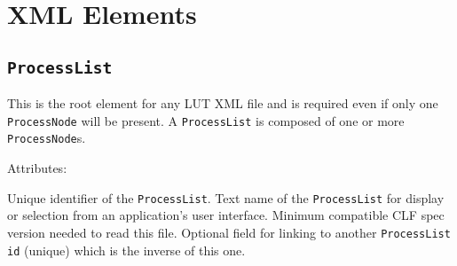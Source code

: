 \regularsectionformat
\chapter{XML Elements}
\label{sec:XMLelements}

\section{\texttt{ProcessList}}
This is the root element for any LUT XML file and is required even if only one \texttt{ProcessNode} will be present. A \texttt{ProcessList} is composed of one or more \texttt{ProcessNode}s.

Attributes:
\begin{xmlfields}
	\xmlitem[id][required] Unique identifier of the \texttt{ProcessList}.
	\xmlitem[name][optional] Text name of the \texttt{ProcessList} for display or selection from an application's user interface.
	\xmlitem[compCLFversion][required] Minimum compatible CLF spec version needed to read this file.
	\xmlitem[inverseOf][optional] Optional field for linking to another \texttt{ProcessList id} (unique) which is the inverse of this one.
\end{xmlfields}

